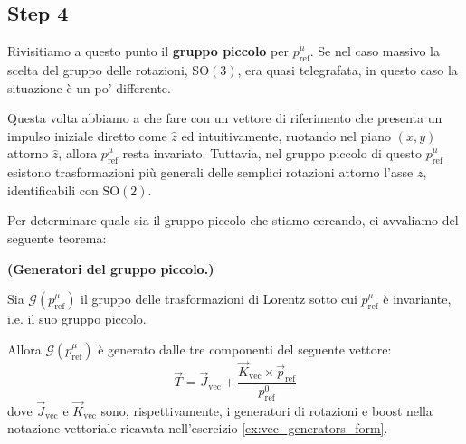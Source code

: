 \documentclass[../main.tex]{subfiles}
\begin{document}
\subsection{Step 4}
Rivisitiamo a questo punto il \textbf{gruppo piccolo} per $p^\mu_\text{ref}$. Se nel caso massivo la scelta del gruppo delle rotazioni, $\text{SO}(3)$, era quasi telegrafata, in questo caso la situazione è un po' differente.

Questa volta abbiamo a che fare con un vettore di riferimento che presenta un impulso iniziale diretto come $\hat{z}$ ed intuitivamente, ruotando nel piano $(x,y)$ attorno $\hat{z}$, allora $p^\mu_\text{ref}$ resta invariato. Tuttavia, nel gruppo piccolo di questo $p^\mu_\text{ref}$ esistono trasformazioni più generali delle semplici rotazioni attorno l'asse $z$, identificabili con $\text{SO}(2)$.

Per determinare quale sia il gruppo piccolo che stiamo cercando, ci avvaliamo del seguente teorema:
\begin{theorem}
    \textbf{(Generatori del gruppo piccolo.)}

    Sia $\mathscr G(p^\mu_\mathrm{ref})$ il gruppo delle trasformazioni di Lorentz sotto cui $p^\mu_\mathrm{ref}$ è invariante, i.e. il suo gruppo piccolo. 

    Allora $\mathscr G(p^\mu_\mathrm{ref})$ è generato dalle tre componenti del seguente vettore:
    \begin{equation}
        \boxed{\Vec{T} = \Vec{J}_\mathrm{vec} + \frac{\Vec{K}_\mathrm{vec}\times\Vec{p}_\mathrm{ref}}{p^0_\mathrm{ref}}}
        \label{eq:littlegroup_gens}
    \end{equation}
    dove $\Vec{J}_\mathrm{vec}$ e $\Vec{K}_\mathrm{vec}$ sono, rispettivamente, i generatori di rotazioni e boost nella notazione vettoriale ricavata nell'esercizio \ref{ex:vec_generators_form}.
    \label{th:littlegroup_gens}
\end{theorem}
\end{document}
